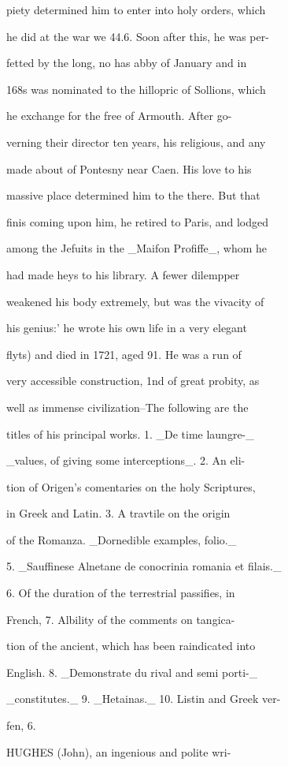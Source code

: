 \documentclass{article}
\begin{document}
piety determined him to enter into holy orders, which

he did at the war we 44.6. Soon after this, he was per-

fetted by the long, no has abby of January and in

168s was nominated to the hillopric of Sollions, which

he exchange for the free of Armouth. After go-

verning their director ten years, his religious, and any

made about of Pontesny near Caen. His love to his

massive place determined him to the there. But that

finis coming upon him, he retired to Paris, and lodged

among the Jefuits in the \_Maifon Profiffe\_, whom he

had made heys to his library. A fewer dilempper

weakened his body extremely, but was the vivacity of

his genius:' he wrote his own life in a very elegant

flyts) and died in 1721, aged 91. He was a run of

very accessible construction, 1nd of great probity, as

well as immense civilization--The following are the

titles of his principal works. 1. \_De time laungre-\_

\_values, of giving some interceptions\_. 2. An eli-

tion of Origen's comentaries on the holy Scriptures,

in Greek and Latin. 3. A travtile on the origin

of the Romanza. \_Dornedible examples, folio.\_

5. \_Sauffinese Alnetane de conocrinia romania et filais.\_

6. Of the duration of the terrestrial passifies, in

French, 7. Albility of the comments on tangica-

tion of the ancient, which has been raindicated into

English. 8. \_Demonstrate du rival and semi porti-\_

\_constitutes.\_ 9. \_Hetainas.\_ 10. Listin and Greek ver-

fen, 6.

HUGHES (John), an ingenious and polite wri-
\end{document}
